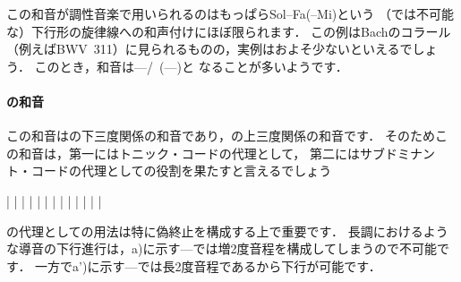 \documentclass[dvipdfmx,uplatex,b5paper,openany,jbase=12Q,nomag*,textwidth-limit=44%
               ]{gachimuchi}[2020/05/05]
\begin{document}
この和音が調性音楽で用いられるのはもっぱらSol\aNatural--Fa\aNatural(--Mi)という
（\Gnv では不可能な）下行形の旋律線への和声付けにほぼ限られます．
この例はBachのコラール（例えばBWV~311）に見られるものの，実例はおよそ少ないといえるでしょう．
このとき，和音は\Gnv\Min---\Gniv\Min/\bFlat\Gnvi\ (---)と
なることが多いようです．

\paragraph{\bFlat\Gnvi の和音}
この和音は\Gni\Min の下三度関係の和音であり，\Gniv\Min の上三度関係の和音です．
そのためこの和音は，第一にはトニック・コードの代理として，
第二にはサブドミナント・コードの代理としての役割を果たすと言えるでしょう

\begin{floatMusic}[pos=ht]
  \Startpiece%
  \znotes|\en
  \znotes|\en
  \NOTes
  |%
  \en\bar
  \NOTEs
  |%
  \en\doublebar
  \znotes|\en
  \NOTes
  |%
  \en\bar
  \NOTEs
  |%
  \en\doublebar
  \znotes|\en
  \NOTEs
  |%
  \en\bar
  \NOTEs
  |%
  \en\setdoublebar
  \endpiece%
\end{floatMusic}

の代理としての用法は特に偽終止を構成する上で重要です．
長調におけるような導音の下行進行は，a)に示す---では増2度音程を構成してしまうので不可能です．
一方でa')に示す---では長2度音程であるから下行が可能です．
\end{document}

